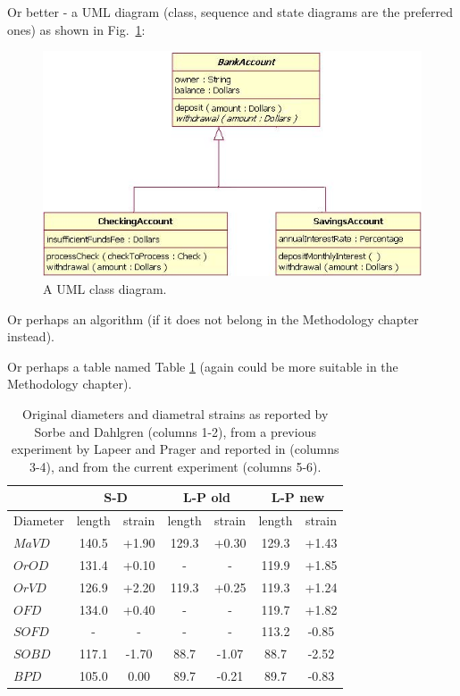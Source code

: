 \documentclass[a4paper, oneside, 11pt]{report}
\newcommand{\mi}{\mathit}
\begin{document}
Or better - a UML diagram (class, sequence and state diagrams are the preferred ones) as shown in Fig.\ \ref{class}:

\begin{figure}[htb]
\includegraphics[width=1.0 \columnwidth]{class.png}
\caption{A UML class diagram.}
\label{class}
\end{figure}

Or perhaps an algorithm (if it does not belong in the Methodology chapter instead).

Or perhaps a table named Table \ref{Res01} (again could be more suitable in the Methodology chapter).

\begin{table}[h]
\caption[]{Original diameters and diametral strains as reported by
  Sorbe and Dahlgren \cite{Sorbe:1983} (columns 1-2), from a previous 
  experiment by Lapeer and Prager and reported in \cite{Lapeer:2001}
  (columns 3-4), and from the current experiment (columns 5-6).}
\begin{center}
\begin{tabular}{|l|c|c||c|c||c|c|}\hline
& \multicolumn{2}{c||}{S-D} & \multicolumn{2}{c||}{L-P old} & \multicolumn{2}{c|}{L-P new} \\ \hline
Diameter & length & strain & length & strain & length & strain \\ \hline
$\mi{MaVD}$ & 140.5 & +1.90 & 129.3 & +0.30 & 129.3 & +1.43 \\
$\mi{OrOD}$ & 131.4 & +0.10 &   -   &  -    & 119.9 & +1.85 \\
$\mi{OrVD}$ & 126.9 & +2.20 & 119.3 & +0.25 & 119.3 & +1.24 \\
$\mi{OFD}$  & 134.0 & +0.40 &  -    &   -   & 119.7 & +1.82 \\ 
$\mi{SOFD}$ &  -    &   -   &  -    &   -   & 113.2 & -0.85 \\
$\mi{SOBD}$ & 117.1 & -1.70 &  88.7 & -1.07 &  88.7 & -2.52 \\
$\mi{BPD}$  & 105.0 &  0.00 &  89.7 & -0.21 &  89.7 & -0.83 \\ \hline
\end{tabular}
\label{Res01}
\end{center}
\end{table}
\end{document}
